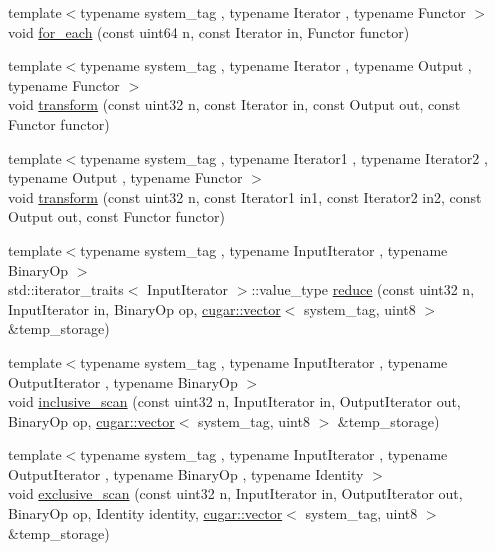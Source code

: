 \begin{DoxyCompactItemize}
\item 
{\footnotesize template$<$typename system\+\_\+tag , typename Iterator , typename Functor $>$ }\\void \hyperlink{group___primitives_ga1e40de6d157d7b833f31f13a26a3bd04}{for\+\_\+each} (const uint64 n, const Iterator in, Functor functor)
\item 
{\footnotesize template$<$typename system\+\_\+tag , typename Iterator , typename Output , typename Functor $>$ }\\void \hyperlink{group___primitives_gab584ee91ed39f9b1fec5aa0e7a0284a4}{transform} (const uint32 n, const Iterator in, const Output out, const Functor functor)
\item 
{\footnotesize template$<$typename system\+\_\+tag , typename Iterator1 , typename Iterator2 , typename Output , typename Functor $>$ }\\void \hyperlink{group___primitives_ga2c0c3bba686f00f120c68465c28f5259}{transform} (const uint32 n, const Iterator1 in1, const Iterator2 in2, const Output out, const Functor functor)
\item 
{\footnotesize template$<$typename system\+\_\+tag , typename Input\+Iterator , typename Binary\+Op $>$ }\\std\+::iterator\+\_\+traits$<$ Input\+Iterator $>$\+::value\+\_\+type \hyperlink{group___primitives_gab8f49b135164aaef1fb6b51b90874915}{reduce} (const uint32 n, Input\+Iterator in, Binary\+Op op, \hyperlink{structcugar_1_1vector}{cugar\+::vector}$<$ system\+\_\+tag, uint8 $>$ \&temp\+\_\+storage)
\item 
{\footnotesize template$<$typename system\+\_\+tag , typename Input\+Iterator , typename Output\+Iterator , typename Binary\+Op $>$ }\\void \hyperlink{group___primitives_ga6c5ea5be5565ce7aa2c99b3e602a7cb7}{inclusive\+\_\+scan} (const uint32 n, Input\+Iterator in, Output\+Iterator out, Binary\+Op op, \hyperlink{structcugar_1_1vector}{cugar\+::vector}$<$ system\+\_\+tag, uint8 $>$ \&temp\+\_\+storage)
\item 
{\footnotesize template$<$typename system\+\_\+tag , typename Input\+Iterator , typename Output\+Iterator , typename Binary\+Op , typename Identity $>$ }\\void \hyperlink{group___primitives_ga1394066fd7b6215bcae781ca56cae872}{exclusive\+\_\+scan} (const uint32 n, Input\+Iterator in, Output\+Iterator out, Binary\+Op op, Identity identity, \hyperlink{structcugar_1_1vector}{cugar\+::vector}$<$ system\+\_\+tag, uint8 $>$ \&temp\+\_\+storage)

\end{DoxyCompactItemize}
